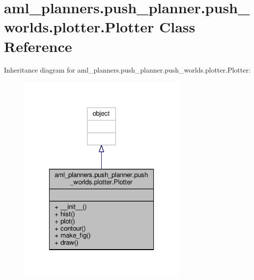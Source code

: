 \hypertarget{classaml__planners_1_1push__planner_1_1push__worlds_1_1plotter_1_1_plotter}{\section{aml\-\_\-planners.\-push\-\_\-planner.\-push\-\_\-worlds.\-plotter.\-Plotter Class Reference}
\label{classaml__planners_1_1push__planner_1_1push__worlds_1_1plotter_1_1_plotter}
}


Inheritance diagram for aml\-\_\-planners.\-push\-\_\-planner.\-push\-\_\-worlds.\-plotter.\-Plotter\-:\nopagebreak
\begin{figure}[H]
\begin{center}
\leavevmode
\includegraphics[width=238pt]{classaml__planners_1_1push__planner_1_1push__worlds_1_1plotter_1_1_plotter__inherit__graph}
\end{center}
\end{figure}


